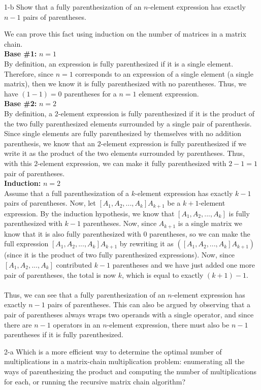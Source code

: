 \documentclass[11pt]{article}
\begin{document}
\begin{prob}{1-b}
Show that a fully parenthesization of an $n$-element expression has exactly $n-1$ pairs of parentheses.
\end{prob}
\begin{sol}
We can prove this fact using induction on the number of matrices in a matrix chain. \\
\textbf{Base \#1:} $n = 1$ \\
By definition, an expression is fully parenthesized if it is a single element. Therefore, since $n=1$ corresponds to an expression of a single element (a single matrix), then we know it is fully parenthesized with no parentheses. Thus, we have $(1-1) = 0$ parentheses for a $n = 1$ element expression.\\
\textbf{Base \#2:} $n = 2$ \\
By definition, a $2$-element expression is fully parenthesized if it is the product of the two fully parenthesized elements surrounded by a single pair of parenthesis. Since single elements are fully parenthesized by themselves with no addition parenthesis, we know that an $2$-element expression is fully parenthesized if we write it as the product of the two elements surrounded by parentheses. Thus, with this $2$-element expression, we can make it fully parenthesized with $2-1 = 1$ pair of parentheses. \\
\textbf{Induction:} $n = 2$ \\
Assume that a full parenthesization of a $k$-element expression has exactly $k-1$ pairs of parentheses. Now, let $[A_1, A_2, ..., A_{k}]A_{k+1}$ be a $k+1$-element expression. By the induction hypothesis, we know that $[A_1, A_2, ..., A_{k}]$ is fully parenthesized with $k-1$ parentheses. Now, since $A_{k+1}$ is a single matrix we know that it is also fully parenthesized with $0$ parentheses, so we can make the full expression $[A_1, A_2, ..., A_{k}]A_{k+1}$ by rewriting it as $([A_1, A_2, ..., A_{k}]A_{k+1})$ (since it is the product of two fully parenthesized expressions). Now, since $[A_1, A_2, ..., A_{k}]$ contributed $k-1$ parentheses and we have just added one more pair of parentheses, the total is now $k$, which is equal to exactly $(k+1) - 1$. \\ \\
Thus, we can see that a fully parenthesization of an $n$-element expression has exactly $n-1$ pairs of parentheses. This can also be argued by observing that a pair of parentheses always wraps two operands with a single operator, and since there are $n-1$ operators in an $n$-element expression, there must also be $n-1$ parentheses if it is fully parenthesized.
\end{sol}

\begin{prob}{2-a}
Which is a more efficient way to determine the optimal number of multiplications in a matrix-chain multiplication problem: enumerating all the ways of parenthesizing the product and computing the number of multiplications for each, or running the recursive matrix chain algorithm?
\end{prob}
\begin{sol}

\end{sol}
\end{document}
